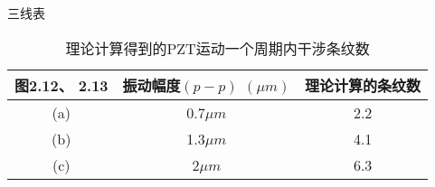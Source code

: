 三线表
\begin{table}[htbp]
  \centering
  \caption{理论计算得到的PZT运动一个周期内干涉条纹数}
  \label{tab:theory}
  \begin{tabular}{ccc}
    \toprule
    图2.12、 2.13 & 振动幅度$(p-p)$ $(\mu m)$ & 理论计算的条纹数 \\
    \midrule
    (a)           & 0.7$\mu m$                & 2.2              \\
    (b)           & 1.3$\mu m$                & 4.1              \\
    (c)           & 2$\mu m$                  & 6.3              \\
    \bottomrule
  \end{tabular}
\end{table}

